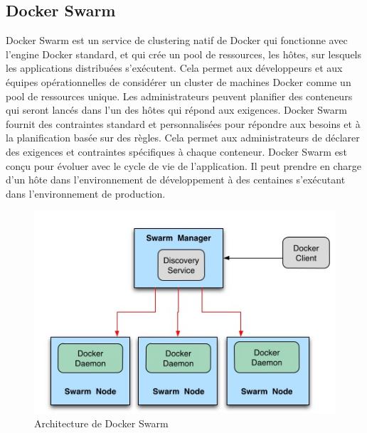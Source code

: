 \begin{onehalfspace}
\subsection{Docker Swarm}
 Docker Swarm est un service de clustering natif de Docker qui fonctionne avec l'engine Docker standard, et qui crée un pool de ressources, les hôtes, sur lesquels les applications distribuées s'exécutent. Cela permet aux développeurs et aux équipes opérationnelles de considérer un cluster de machines Docker comme un pool de ressources unique. Les administrateurs peuvent planifier des conteneurs qui seront lancés dans l'un des hôtes qui répond aux exigences. Docker Swarm fournit des contraintes standard et personnalisées pour répondre aux besoins et à la planification basée sur des règles. Cela permet aux administrateurs de déclarer des exigences et contraintes spécifiques à chaque conteneur. Docker Swarm est conçu pour évoluer avec le cycle de vie de l'application. Il peut prendre en charge d'un hôte dans l'environnement de développement à des centaines s'exécutant dans l'environnement de production.
\begin{figure}[H]
\centering
\includegraphics [scale=0.6]{chapitre3/assets/dockerswarm.png}
\caption{Architecture de Docker Swarm}
\end{figure}

\end{onehalfspace}

